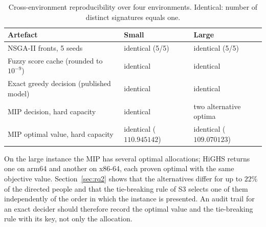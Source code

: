 \documentclass[systems,article,submit,moreauthors,pdftex]{Definitions/mdpi}
\begin{document}
\begin{table}[H]
\centering
\caption{Cross-environment reproducibility over four environments. Identical: number of
distinct signatures equals one.\label{tab:crossenv}}
\small
\begin{tabular}{lll}
\toprule
Artefact & Small & Large\\
\midrule
NSGA-II fronts, 5 seeds & identical (5/5) & identical (5/5)\\
Fuzzy score cache (rounded to $10^{-9}$) & identical & identical\\
Exact greedy decision (published model) & identical & identical\\
MIP decision, hard capacity & identical & two alternative optima\\
MIP optimal value, hard capacity & identical ($110.945142$) & identical ($109.070123$)\\
\bottomrule
\end{tabular}
\end{table}

On the large instance the MIP has several optimal allocations; HiGHS returns one on arm64 and
another on x86-64, each proven optimal with the same objective value. Section~\ref{sec:rq2} shows
that the alternatives differ for up to $22\%$ of the directed people and that the tie-breaking
rule of S3 selects one of them independently of the order in which the instance is presented. An
audit trail for an exact decider should therefore record the optimal value and the tie-breaking
rule with its key, not only the allocation.



\end{document}
